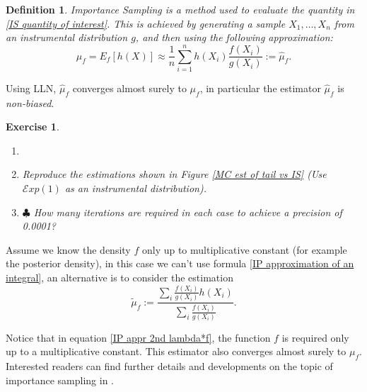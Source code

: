 \documentclass{article}\usepackage[]{graphicx}\usepackage[]{xcolor}
\newtheorem{exercise}{Exercise}
\newtheorem{definition}{Definition}
\begin{document}
\begin{definition}
\textit{Importance Sampling} is a method used to evaluate the quantity in \eqref{IS quantity of interest}. This is achieved by generating a sample $X_1, \dots, X_n$ from an \textit{instrumental} distribution $g$, and then using the following approximation:
\begin{equation}\label{IP approximation of an integral}
\mu_f = E_f\left[h(X)\right] \approx \frac{1}{n} \sum\limits_{i=1}^n h(X_i)\frac{f(X_i)}{g(X_i)}:=\hat{\mu}_f.
\end{equation}
\end{definition}

Using LLN, $\hat{\mu}_f$ converges almost surely to $\mu_f$, in particular the estimator $\hat{\mu}_f$ is \textit{non-biased}.

\begin{exercise}
\begin{enumerate}
    \item[]
    \item Reproduce the estimations shown in Figure \ref{MC est of tail vs IS} (Use $\mathcal{E}xp(1)$ as an instrumental distribution).
    \item $\clubsuit$ How many iterations are required in each case to achieve a precision of 0.0001?
\end{enumerate}
\end{exercise}

Assume we know the density $f$ only up to multiplicative constant (for example the posterior density), in this case we can't use formula \ref{IP approximation of an integral}, an alternative is to consider the estimation 
\begin{equation}\label{IP appr 2nd lambda*f}
\tilde{\mu}_f := \frac{\sum\limits_i \frac{f(X_i)}{g(X_i)}h(X_i)}{\sum\limits_i\frac{f(X_i)}{g(X_i)}}.
\end{equation}

Notice that in equation \eqref{IP appr 2nd lambda*f}, the function $f$ is required only up to a multiplicative constant. This estimator also converges almost surely to $\mu_f$. Interested readers can find further details and developments on the topic of importance sampling in \cite{tokdar2010importance}.
\end{document}
